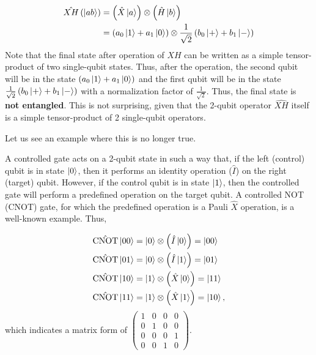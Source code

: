 \documentclass[12pt,oneside]{book}
\begin{document}
\begin{align}
\hat{XH}\left(\ket{ab}\right)&{}=\left(\hat{X}\ket{a}\right)\otimes\left(\hat{H}\ket{b}\right)\\
&{}=\left(a_0\ket{1}+a_1\ket{0}\right) \otimes \frac{1}{\sqrt{2}} \left(b_0\ket{+}+b_1\ket{-}\right)
\end{align}
Note that the final state after operation of $\hat{XH}$ can be written as a simple tensor-product of two single-qubit states. Thus, after the operation, the second qubit will be in the state $\left(a_0\ket{1}+a_1\ket{0}\right)$ and the first qubit will be in the state $\frac{1}{\sqrt{2}} \left(b_0\ket{+}+b_1\ket{-}\right)$ with a normalization factor of $\frac{1}{\sqrt{2}}$. Thus, the final state is \textbf{not entangled}. This is not surprising, given that the 2-qubit operator $\hat{XH}$ itself is a simple tensor-product of 2 single-qubit operators.

Let us see an example where this is no longer true. 

A controlled gate acts on a 2-qubit state in such a way that, if the left (control) qubit is in state $\ket{0}$, then it performs an identity operation ($\hat{I}$) on the right (target) qubit. However, if the control qubit is in state $\ket{1}$, then the controlled gate will perform a predefined operation on the target qubit. A controlled NOT (CNOT) gate, for which the predefined operation is a Pauli $\hat{X}$ operation, is a well-known example. Thus,

\begin{align*}
    \hat{\mathrm{CNOT}}\ket{00} &{}= \ket{0} \otimes \left(\hat{I}\ket{0}\right)= \ket{00}\\
    \hat{\mathrm{CNOT}}\ket{01} &{}= \ket{0} \otimes \left(\hat{I}\ket{1}\right) = \ket{01}\\
    \hat{\mathrm{CNOT}}\ket{10} &{}= \ket{1} \otimes \left(\hat{X}\ket{0}\right) = \ket{11}\\
    \hat{\mathrm{CNOT}}\ket{11} &{}=  \ket{1} \otimes \left(\hat{X}\ket{1}\right) = \ket{10},\\
\end{align*}
which indicates a matrix form of $\begin{pmatrix}
    1 & 0 & 0 & 0\\ 0 & 1 & 0 & 0\\0 & 0 & 0 & 1\\ 0 & 0 & 1 & 0
\end{pmatrix}$.
\end{document}
